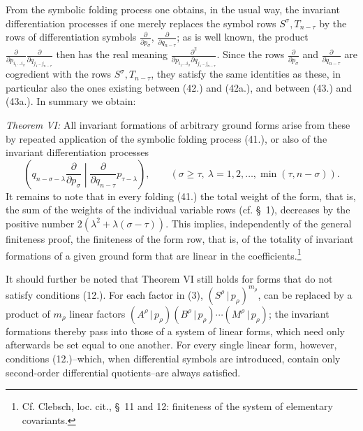\documentclass[11pt]{article}
\providecommand{\pair}[2]{(#1\,|\,#2)}
\begin{document}
From the symbolic folding process one obtains, in the usual way, the invariant differentiation processes if one merely replaces the symbol rows $S^\sigma,T_{n-\tau}$ by the rows of differentiation symbols $\frac{\partial}{\partial p_\sigma}$, $\frac{\partial}{\partial q_{n-\tau}}$; as is well known, the product $\frac{\partial}{\partial p_{i_1\ldots i_\sigma}}\frac{\partial}{\partial q_{j_1\ldots j_{n-\tau}}}$ then has the real meaning $\frac{\partial^2}{\partial p_{i_1\ldots i_\sigma}\partial q_{j_1\ldots j_{n-\tau}}}$. Since the rows $\frac{\partial}{\partial p_\sigma}$ and $\frac{\partial}{\partial q_{n-\tau}}$ are cogredient with the rows $S^\sigma,T_{n-\tau}$, they satisfy the same identities as these, in particular also the ones existing between (42.) and (42a.), and between (43.) and (43a.). In summary we obtain:

\emph{Theorem VI:} All invariant formations of arbitrary ground forms arise from these by repeated application of the symbolic folding process (41.), or also of the invariant differentiation processes
\begin{equation}
 \left(q_{n-\sigma-\lambda}\frac{\partial}{\partial p_\sigma}\middle|\frac{\partial}{\partial q_{n-\tau}}p_{\tau-\lambda}\right),
 \qquad(\sigma\ge\tau,\ \lambda=1,2,\ldots,\min(\tau,n-\sigma)).
\tag{45}
\end{equation}
It remains to note that in every folding (41.) the total weight of the form, that is, the sum of the weights of the individual variable rows (cf. \S\ 1), decreases by the positive number $2(\lambda^2+\lambda(\sigma-\tau))$. This implies, independently of the general finiteness proof, the finiteness of the form row, that is, of the totality of invariant formations of a given ground form that are linear in the coefficients.\footnote{Cf. Clebsch, loc. cit., \S\ 11 and 12: finiteness of the system of elementary covariants.}

It should further be noted that Theorem VI still holds for forms that do not satisfy conditions (12.). For each factor in (3), $\pair{S^\rho}{p_\rho}^{m_\rho}$, can be replaced by a product of $m_\rho$ linear factors $\pair{A^\rho}{p_\rho}\pair{B^\rho}{p_\rho}\cdots\pair{M^\rho}{p_\rho}$; the invariant formations thereby pass into those of a system of linear forms, which need only afterwards be set equal to one another. For every single linear form, however, conditions (12.)--which, when differential symbols are introduced, contain only second-order differential quotients--are always satisfied.
\end{document}
